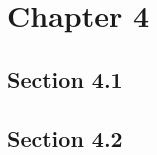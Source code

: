 \chapter{Chapter 4}
\label{cha:chap4}


\section{Section 4.1}
\label{sec:chap4sec1}


\section{Section 4.2}
\label{sec:chap4sec2}

